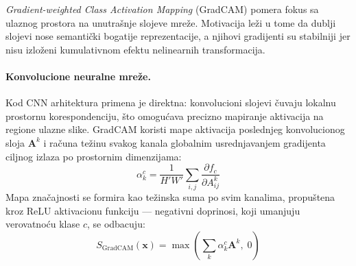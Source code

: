 \textit{Gradient-weighted Class Activation Mapping} (GradCAM) \cite{selvaraju2017gradcam} 
pomera fokus sa ulaznog prostora na unutrašnje slojeve mreže. Motivacija leži u tome da 
dublji slojevi nose semantički bogatije reprezentacije, a njihovi gradijenti su stabilniji 
jer nisu izloženi kumulativnom efektu nelinearnih transformacija.

\paragraph{Konvolucione neuralne mreže.}
Kod CNN arhitektura primena je direktna: konvolucioni slojevi čuvaju lokalnu prostornu 
korespondenciju, što omogućava precizno mapiranje aktivacija na regione ulazne slike. 
GradCAM koristi mape aktivacija poslednjeg konvolucionog sloja $\mathbf{A}^k$ i računa 
težinu svakog kanala globalnim usrednjavanjem gradijenta ciljnog izlaza po prostornim 
dimenzijama:
\begin{equation}
    \alpha_k^c = \frac{1}{H' W'} \sum_{i,j} \frac{\partial f_c}{\partial A^k_{ij}}
\end{equation}
Mapa značajnosti se formira kao težinska suma po svim kanalima, propuštena kroz ReLU aktivacionu funkciju ---
negativni doprinosi, koji umanjuju verovatnoću klase $c$, se odbacuju:
\begin{equation}
    S_{\text{GradCAM}}(\mathbf{x}) = \max\!\left(\sum_k \alpha_k^c \mathbf{A}^k,\; 0\right)
\end{equation}

